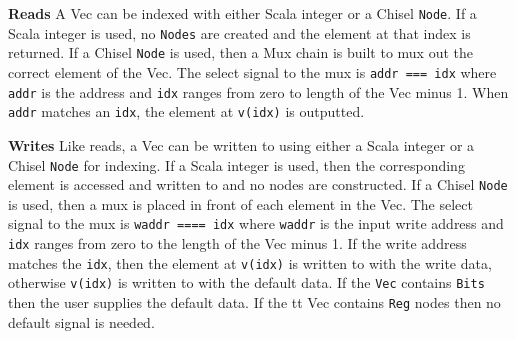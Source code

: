 \textbf{Reads} A Vec can be indexed with either Scala integer or a
Chisel {\tt Node}. If a Scala integer is used, no {\tt Nodes} are
created and the element at that index is returned. If a Chisel 
{\tt Node} is used, then a Mux chain is built to mux out the correct
element of the Vec. The select signal to the mux is {\tt addr === idx}
where {\tt addr} is the address and {\tt idx} ranges from zero to
length of the Vec minus 1. When {\tt addr} matches an {\tt idx}, the
element at {\tt v(idx)} is outputted.

\textbf{Writes} Like reads, a Vec can be written to using either a
Scala integer or a Chisel {\tt Node} for indexing. If a Scala integer
is used, then the corresponding element is accessed and written to and
no nodes are constructed. If a Chisel {\tt Node} is used, then a mux
is placed in front of each element in the Vec. The select signal to
the mux is {\tt waddr ==== idx} where {\tt waddr} is the input write
address and {\tt idx} ranges from zero to the length of the Vec minus
1. If the write address matches the {\tt idx}, then the element at
{\tt v(idx)} is written to with the write data, otherwise {\tt v(idx)}
is written to with the default data. If the {\tt Vec} contains 
{\tt Bits} then the user supplies the default data. If the {tt Vec}
contains {\tt Reg} nodes then no default signal is needed.
